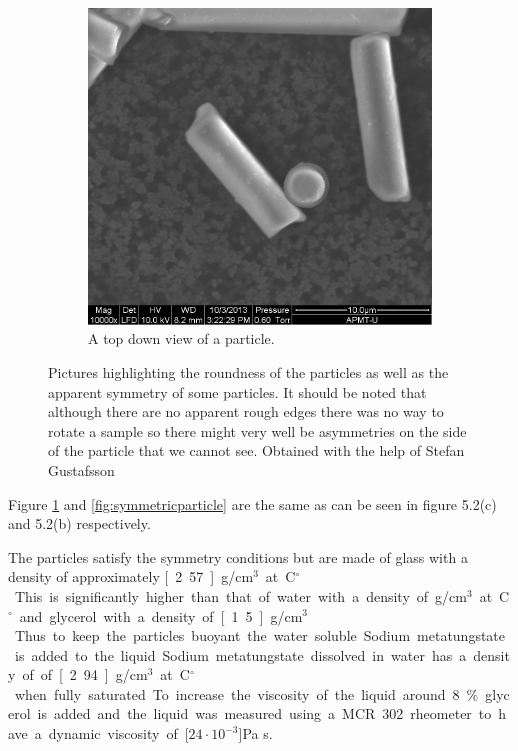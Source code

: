 \begin{figure}[H]
\begin{subfigure}[3b]{0.40\textwidth}
\includegraphics[width=\textwidth]{figures/method/round.png}
\caption{A top down view of a particle.}\label{fig:roundparticle}
\end{subfigure}
\caption{Pictures highlighting the roundness of the particles as well as the apparent symmetry of some particles. It should be noted that although there are no apparent rough edges there was no way to rotate a sample so there might very well be asymmetries on the side of the particle that we cannot see. Obtained with the help of Stefan Gustafsson}
\label{fig:particlepictures2}
\end{figure}

Figure \ref{fig:roundparticle} and \ref{fig:symmetricparticle} are the same as can be seen in \cite{alexanderThesis} figure 5.2(c) and 5.2(b) respectively. 

The particles satisfy the symmetry conditions but are made of glass with a density of approximately 
\unit[2.57]{g/cm$^3$} at \unit[20]{C$^\circ$}. This is significantly higher than that of water with a density of 
\unit[1]{g/cm$^3$} at \unit[20]{C$^\circ$} and glycerol with a density of \unit[1.5]{g/cm$^3$}. Thus to keep the particles buoyant the water soluble Sodium metatungstate is added to the liquid. Sodium metatungstate dissolved in water has a density of of \unit[2.94]{g/cm$^3$} at \unit[20]{C$^\circ$} when fully saturated. To increase the viscosity of the liquid around 8\% glycerol is added and the liquid was measured using a MCR 302 rheometer to have a dynamic viscosity of \unit[$24\cdot 10^{-3}$]{Pa s}.
